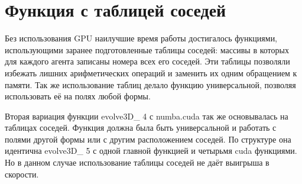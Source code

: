 \documentclass[a4paper,12pt]{article}
\begin{document}
\section{Функция с таблицей соседей}

Без использования GPU наилучшие время работы достигалось функциями, использующими заранее подготовленные таблицы соседей: массивы в которых для каждого агента записаны номера всех его соседей. Эти таблицы позволяли избежать лишних арифметических операций и заменить их одним обращением к памяти. Так же использование таблиц делало функцию универсальной, позволяя использовать её на полях любой формы.

Вторая вариация функции evolve3D\_ 4 с numba.cuda так же основывалась на таблицах соседей. Функция должна была быть универсальной и работать с полями другой формы или с другим расположением соседей. По структуре она идентична evolve3D\_ 5 с одной главной функцией и четырьмя cuda функциями. Но в данном случае использование таблицы соседей не даёт выигрыша в скорости.
\end{document}
